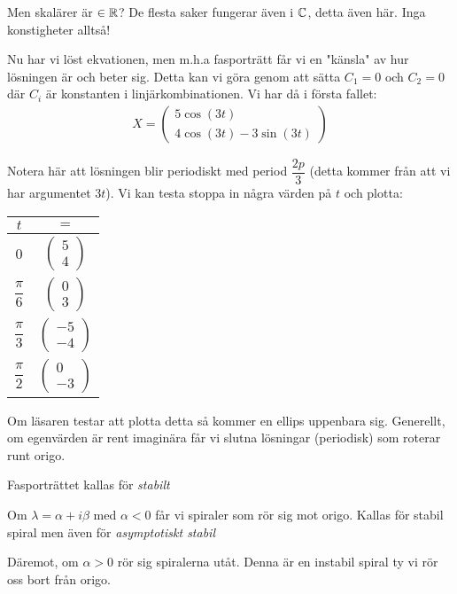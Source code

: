 \noindent Men skalärer är $\in\mathbb{R}$? De flesta saker fungerar även i $\mathbb{C}$, detta även här. Inga konstigheter alltså!
\par\bigskip
\noindent Nu har vi löst ekvationen, men m.h.a fasporträtt får vi en "känsla" av hur lösningen är och beter sig. Detta kan vi göra genom att sätta $C_1 = 0$ och $C_2=0$ där $C_i$ är konstanten i linjärkombinationen. Vi har då i första fallet:
\begin{equation*}
  \begin{gathered}
    X = \begin{pmatrix}5\cos(3t)\\4\cos(3t)-3\sin(3t)\end{pmatrix}
  \end{gathered}
\end{equation*}\par
\noindent Notera här att lösningen blir periodiskt med period $\dfrac{2p}{3}$ (detta kommer från att vi har argumentet $3t$). Vi kan testa stoppa in några värden på $t$ och plotta:
\par\bigskip
\begin{center}
  \begin{tabular}{c|c}
    $t$&$=$\\
    \hline
    0&$\begin{pmatrix}5\\4\end{pmatrix}$\\
    \hline
    $\dfrac{\pi}{6}$&$\begin{pmatrix}0\\3\end{pmatrix}$\\
    \hline
    $\dfrac{\pi}{3}$&$\begin{pmatrix}-5\\-4\end{pmatrix}$\\
    \hline
    $\dfrac{\pi}{2}$&$\begin{pmatrix}0\\-3\end{pmatrix}$
  \end{tabular}
\end{center}\par
\noindent Om läsaren testar att plotta detta så kommer en ellips uppenbara sig. Generellt, om egenvärden är rent imaginära får vi slutna lösningar (periodisk) som roterar runt origo.
\par
\noindent Fasporträttet kallas för \textit{stabilt}
\par\bigskip
\noindent Om $\lambda = \alpha+i\beta$ med $\alpha<0$ får vi spiraler som rör sig mot origo. Kallas för stabil spiral men även för \textit{asymptotiskt stabil}\par
\noindent Däremot, om $\alpha>0$ rör sig spiralerna utåt. Denna är en instabil spiral ty vi rör oss bort från origo.
\par\bigskip
